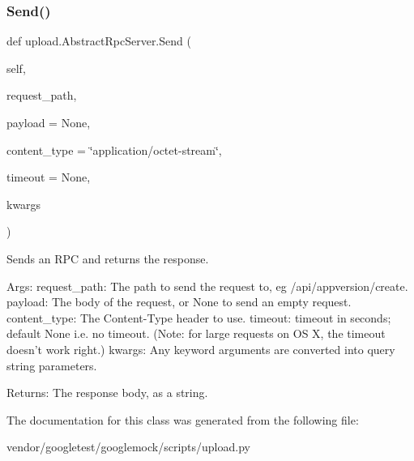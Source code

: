 \subsubsection{\texorpdfstring{Send()}{Send()}\hspace{0.1cm}{\footnotesize\ttfamily [2/2]}}
{\footnotesize\ttfamily def upload.\+Abstract\+Rpc\+Server.\+Send (\begin{DoxyParamCaption}\item[{}]{self,  }\item[{}]{request\+\_\+path,  }\item[{}]{payload = {\ttfamily None},  }\item[{}]{content\+\_\+type = {\ttfamily \char`\"{}application/octet-\/stream\char`\"{}},  }\item[{}]{timeout = {\ttfamily None},  }\item[{}]{kwargs }\end{DoxyParamCaption})}

\begin{DoxyVerb}Sends an RPC and returns the response.

Args:
  request_path: The path to send the request to, eg /api/appversion/create.
  payload: The body of the request, or None to send an empty request.
  content_type: The Content-Type header to use.
  timeout: timeout in seconds; default None i.e. no timeout.
(Note: for large requests on OS X, the timeout doesn't work right.)
  kwargs: Any keyword arguments are converted into query string parameters.

Returns:
  The response body, as a string.
\end{DoxyVerb}
 

The documentation for this class was generated from the following file\+:\begin{DoxyCompactItemize}
\item 
vendor/googletest/googlemock/scripts/upload.\+py\end{DoxyCompactItemize}
